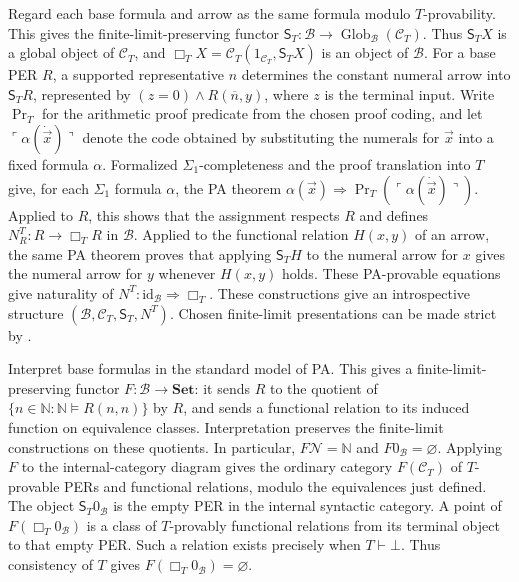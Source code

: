 \documentclass[11pt]{article}
\theoremstyle{definition}
\theoremstyle{remark}
\begin{document}
Regard each base formula and arrow as the same formula modulo
$T$-provability. This gives the finite-limit-preserving functor
$\mathsf S_T:\mathcal B\to
\operatorname{Glob}_{\mathcal B}(\mathcal C_T)$.
Thus $\mathsf S_TX$ is a global object of $\mathcal C_T$, and
$\Box_TX=\mathcal C_T(1_{\mathcal C_T},\mathsf S_TX)$ is an
object of $\mathcal B$. For a base PER $R$, a supported
representative $n$ determines the constant numeral arrow into
$\mathsf S_TR$, represented by
$(z=0)\wedge R(\overline n,y)$, where $z$ is the terminal input.
Write $\operatorname{Pr}_T$ for the arithmetic proof predicate
from the chosen proof coding, and let
$\ulcorner\alpha(\dot{\vec x})\urcorner$ denote the code obtained
by substituting the numerals for $\vec x$ into a fixed formula $\alpha$.
Formalized $\Sigma_1$-completeness and the proof translation into
$T$ give, for each $\Sigma_1$ formula $\alpha$, the PA theorem
$\alpha(\vec x)\Rightarrow
\operatorname{Pr}_T(\ulcorner\alpha(\dot{\vec x})\urcorner)$.
Applied to $R$, this shows that the assignment respects $R$ and defines
$N^T_R:R\to\Box_TR$ in $\mathcal B$.
Applied to the functional relation $H(x,y)$ of an arrow, the
same PA theorem proves that applying $\mathsf S_TH$ to the
numeral arrow for $x$ gives the numeral arrow for $y$ whenever
$H(x,y)$ holds. These PA-provable equations give naturality of
$N^T:\mathrm{id}_{\mathcal B}\Rightarrow\Box_T$.
These constructions give an introspective structure
$(\mathcal B,\mathcal C_T,\mathsf S_T,N^T)$.
Chosen finite-limit presentations can be made strict by
\cite[Theorem~5.9]{Ramesh}.

Interpret base formulas in the standard model of PA. This gives
a finite-limit-preserving functor $F:\mathcal B\to\mathbf{Set}$:
it sends $R$ to the quotient of
$\{n\in\mathbb N:\mathbb N\models R(n,n)\}$ by $R$, and sends a functional
relation to its induced function on equivalence classes.
Interpretation preserves the finite-limit constructions on
these quotients. In particular, $F\mathcal N=\mathbb N$ and
$F0_{\mathcal B}=\varnothing$.
Applying $F$ to the internal-category diagram gives the ordinary
category $F(\mathcal C_T)$ of $T$-provable PERs and functional
relations, modulo the equivalences just defined.
The object $\mathsf S_T0_{\mathcal B}$ is the empty PER in the
internal syntactic category. A point of $F(\Box_T0_{\mathcal B})$
is a class of $T$-provably functional relations from its terminal
object to that empty PER. Such a relation exists precisely when
$T\vdash\bot$. Thus consistency of $T$ gives
$F(\Box_T0_{\mathcal B})=\varnothing$.
\end{document}

